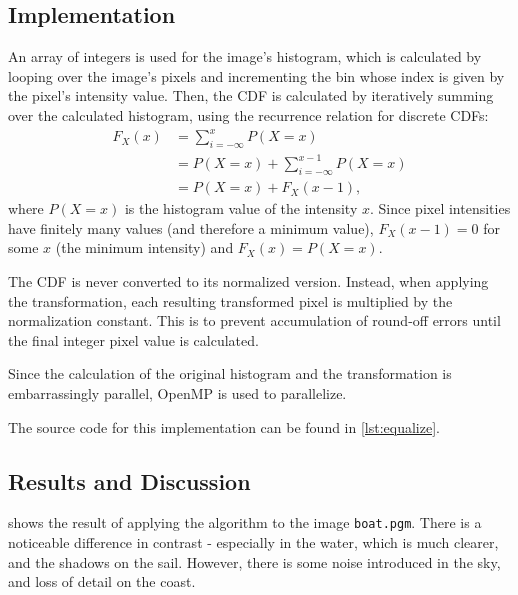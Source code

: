 \documentclass[headings=optiontoheadandtoc,listof=totoc,parskip=full]{scrartcl}
\begin{document}
\subsection{Implementation}
\label{sec:equalization-implementation}

An array of integers is used for the image's histogram, which is calculated by looping over the image's pixels and incrementing the bin whose index is given by the pixel's intensity value. Then, the CDF is calculated by iteratively summing over the calculated histogram, using the recurrence relation for discrete CDFs:
\begin{equation}
	\begin{aligned}
		F_X(x) &= \sum_{i = -\infty}^x P(X = x)\\
			&= P(X = x) + \sum_{i = -\infty}^{x - 1} P(X = x)\\
			&= P(X = x) + F_X(x - 1),
	\end{aligned}
\end{equation}
where $P(X = x)$ is the histogram value of the intensity $x$. Since pixel intensities have finitely many values (and therefore a minimum value), $F_X(x - 1) = 0$ for some $x$ (the minimum intensity) and $F_X(x) = P(X = x)$.

The CDF is never converted to its normalized version. Instead, when applying the transformation, each resulting transformed pixel is multiplied by the normalization constant. This is to prevent accumulation of round-off errors until the final integer pixel value is calculated. \par

Since the calculation of the original histogram and the transformation is embarrassingly parallel, OpenMP is used to parallelize. \par

The source code for this implementation can be found in \cref{lst:equalize}.

\subsection{Results and Discussion}
\label{sec:equalization-results}

 shows the result of applying the algorithm to the image \texttt{boat.pgm}. There is a noticeable difference in contrast - especially in the water, which is much clearer, and the shadows on the sail. However, there is some noise introduced in the sky, and loss of detail on the coast.
\end{document}
